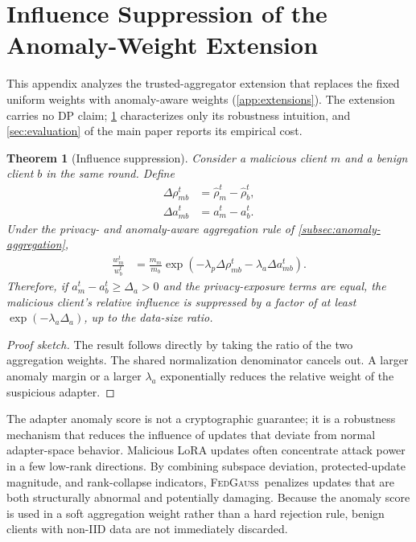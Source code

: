 \documentclass[a4paper,fleqn]{cas-dc}
\newtheorem{theorem}{Theorem}
\newcommand{\method}{\textsc{FedGauss}}
\begin{document}
\section{Influence Suppression of the Anomaly-Weight Extension}
\label{app:influence}
This appendix analyzes the trusted-aggregator extension that replaces the
fixed uniform weights with anomaly-aware weights
(\cref{app:extensions}). The extension carries no DP claim;
\cref{thm:influence} characterizes only its robustness intuition, and
\cref{sec:evaluation} of the main paper reports its empirical cost.
\begin{theorem}[Influence suppression]\label{thm:influence}
Consider a malicious client $m$ and a benign client $b$ in the same round.
Define
\begin{equation}
\begin{aligned}
\Delta\rho_{mb}^t&=\hat{\rho}_m^t-\hat{\rho}_b^t,\\
\Delta a_{mb}^t&=a_m^t-a_b^t.
\end{aligned}
\end{equation}
Under the privacy- and anomaly-aware aggregation rule of \cref{subsec:anomaly-aggregation},
\begin{equation}
\begin{aligned}
\frac{w_m^t}{w_b^t}
&=
\frac{m_m}{m_b}
\exp\left(-\lambda_p\Delta\rho_{mb}^t-\lambda_a\Delta a_{mb}^t\right).
\end{aligned}
\end{equation}
Therefore, if $a_m^t-a_b^t\geq \Delta_a>0$ and the privacy-exposure terms are
equal, the malicious client's relative influence is suppressed by a factor
of at least $\exp(-\lambda_a\Delta_a)$, up to the data-size ratio.
\end{theorem}
\begin{proof}[Proof sketch]
The result follows directly by taking the ratio of the two aggregation
weights. The shared normalization denominator cancels out. A larger anomaly
margin or a larger $\lambda_a$ exponentially reduces the relative weight of
the suspicious adapter.
\end{proof}
The adapter anomaly score is not a cryptographic guarantee; it is a
robustness mechanism that reduces the influence of updates that deviate from
normal adapter-space behavior. Malicious LoRA updates often concentrate
attack power in a few low-rank directions. By combining subspace deviation,
protected-update magnitude, and rank-collapse indicators, \method\ penalizes
updates that are both structurally abnormal and potentially damaging. Because
the anomaly score is used in a soft aggregation weight rather than a hard
rejection rule, benign clients with non-IID data are not immediately
discarded.
\end{document}

